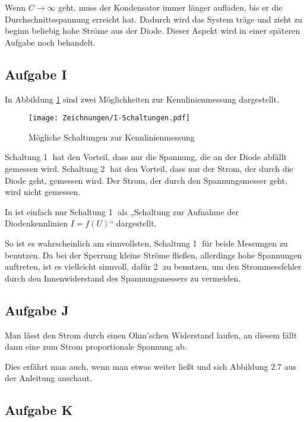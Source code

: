 Wenn $C \to \infty$ geht, muss der Kondensator immer länger aufladen, bis er
die Durchschnittsspannung erreicht hat. Dadurch wird das System träge und zieht
zu beginn beliebig hohe Ströme aus der Diode. Dieser Aspekt wird in einer
späteren Aufgabe noch behandelt.

\subsection{Aufgabe I}

In Abbildung \ref{fig:I-Schaltungen} sind zwei Möglichkeiten zur
Kennlinienmessung dargestellt.

\begin{figure}[h]
	\centering
	\caption{%
		Mögliche Schaltungen zur Kennlinienmessung
	}
	\label{fig:I-Schaltungen}
	\texttt{[image: Zeichnungen/I-Schaltungen.pdf]}
\end{figure}

Schaltung \textcircled 1 hat den Vorteil, dass nur die Spannung, die an der
Diode abfällt gemessen wird. Schaltung \textcircled 2 hat den Vorteil, dass nur
der Strom, der durch die Diode geht, gemessen wird. Der Strom, der durch den
Spannungsmesser geht, wird nicht gemessen.

In \cite[Bild 14.2]{beuth/elementare_elektronik} ist einfach nur Schaltung
\textcircled 1 als „Schaltung zur Aufnahme der Diodenkennlinien $I = f(U)$“
dargestellt.

So ist es wahrscheinlich am sinnvollsten, Schaltung \textcircled 1 für beide
Messungen zu benutzen. Da bei der Sperrung kleine Ströme fließen, allerdings
hohe Spannungen auftreten, ist es vielleicht sinnvoll, dafür \textcircled 2 zu
benutzen, um den Strommessfehler durch den Innenwiderstand des Spannungsmessers
zu vermeiden.

\subsection{Aufgabe J}

Man lässt den Strom durch einen Ohm'schen Widerstand laufen, an diesem fällt
dann eine zum Strom proportionale Spannung ab.

Dies erfährt man auch, wenn man etwas weiter ließt und sich Abbildung 2.7 aus
der Anleitung anschaut.

\subsection{Aufgabe K}

